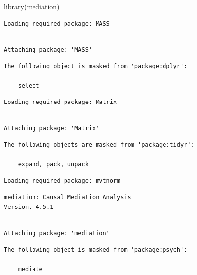 \documentclass[
  letterpaper,
  DIV=11,
  numbers=noendperiod]{scrartcl}
\newenvironment{Shaded}{\begin{snugshade}}{\end{snugshade}}
\newcommand{\FunctionTok}[1]{\textcolor[rgb]{0.28,0.35,0.67}{#1}}
\newcommand{\NormalTok}[1]{\textcolor[rgb]{0.00,0.23,0.31}{#1}}
\begin{document}
\begin{Shaded}
\begin{Highlighting}[]
\FunctionTok{library}\NormalTok{(mediation)}
\end{Highlighting}
\end{Shaded}

\begin{verbatim}
Loading required package: MASS
\end{verbatim}

\begin{verbatim}

Attaching package: 'MASS'
\end{verbatim}

\begin{verbatim}
The following object is masked from 'package:dplyr':

    select
\end{verbatim}

\begin{verbatim}
Loading required package: Matrix
\end{verbatim}

\begin{verbatim}

Attaching package: 'Matrix'
\end{verbatim}

\begin{verbatim}
The following objects are masked from 'package:tidyr':

    expand, pack, unpack
\end{verbatim}

\begin{verbatim}
Loading required package: mvtnorm
\end{verbatim}

\begin{verbatim}
mediation: Causal Mediation Analysis
Version: 4.5.1
\end{verbatim}

\begin{verbatim}

Attaching package: 'mediation'
\end{verbatim}

\begin{verbatim}
The following object is masked from 'package:psych':

    mediate
\end{verbatim}
\end{document}
